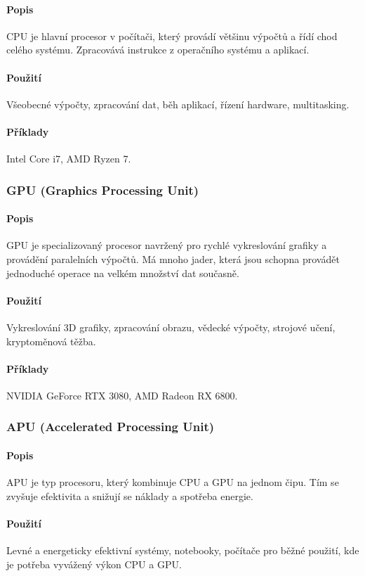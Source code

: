 \paragraph{Popis} CPU je hlavní procesor v počítači, který provádí většinu výpočtů a řídí chod celého systému. Zpracovává instrukce z operačního systému a aplikací.
\paragraph{Použití} Všeobecné výpočty, zpracování dat, běh aplikací, řízení hardware, multitasking. 
\paragraph{Příklady} Intel Core i7, AMD Ryzen 7.

\subsubsection{GPU (Graphics Processing Unit)}
\paragraph{Popis} GPU je specializovaný procesor navržený pro rychlé vykreslování grafiky a provádění paralelních výpočtů. Má mnoho jader, která jsou schopna provádět jednoduché operace na velkém množství dat současně.
\paragraph{Použití} Vykreslování 3D grafiky, zpracování obrazu, vědecké výpočty, strojové učení, kryptoměnová těžba. 
\paragraph{Příklady} NVIDIA GeForce RTX 3080, AMD Radeon RX 6800.

\subsubsection{APU (Accelerated Processing Unit)}
\paragraph{Popis} APU je typ procesoru, který kombinuje CPU a GPU na jednom čipu. Tím se zvyšuje efektivita a snižují se náklady a spotřeba energie.
\paragraph{Použití} Levné a energeticky efektivní systémy, notebooky, počítače pro běžné použití, kde je potřeba vyvážený výkon CPU a GPU.
